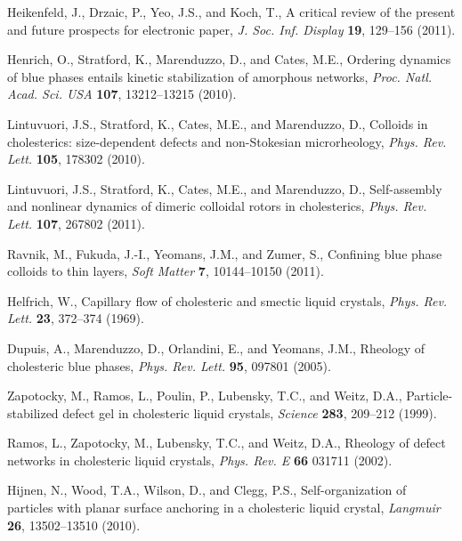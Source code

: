 \documentclass[12pt]{article}
\begin{document}
\begin{thebibliography}{99}
Heikenfeld, J., Drzaic, P., Yeo, J.S., and Koch, T.,
A critical review of the present and future prospects for electronic paper,
{\it J. Soc. Inf. Display} {\bf 19}, 129--156 (2011).

Henrich, O., Stratford, K., Marenduzzo, D., and  Cates, M.E.,
Ordering dynamics of blue phases entails kinetic stabilization of amorphous
networks, {\it Proc. Natl. Acad. Sci. USA} {\bf 107}, 13212--13215 (2010).

Lintuvuori, J.S.,  Stratford, K., Cates, M.E., and Marenduzzo, D.,
Colloids in cholesterics: size-dependent defects and non-Stokesian
microrheology, {\it Phys. Rev. Lett.} {\bf 105}, 178302 (2010).

Lintuvuori, J.S.,  Stratford, K.,  Cates, M.E., and  Marenduzzo, D.,
Self-assembly and nonlinear dynamics of dimeric colloidal rotors in 
cholesterics, {\it Phys. Rev. Lett.} {\bf 107}, 267802 (2011).

Ravnik, M., Fukuda, J.-I.,  Yeomans, J.M., and Zumer, S.,
Confining blue phase colloids to thin layers,
{\it Soft Matter} {\bf 7}, 10144--10150 (2011).

 	Helfrich, W.,
Capillary flow of cholesteric and smectic liquid crystals,
{\it Phys. Rev. Lett.} {\bf 23}, 372--374 (1969).

Dupuis, A.,  Marenduzzo, D.,  Orlandini, E., and Yeomans, J.M.,
Rheology of cholesteric blue phases,
{\it Phys. Rev. Lett.} {\bf 95}, 097801 (2005).

Zapotocky, M., Ramos, L., Poulin, P.,  Lubensky, T.C.,  and Weitz, D.A.,
Particle-stabilized defect gel in cholesteric liquid crystals,
{\it Science} {\bf 283}, 209--212 (1999).

Ramos, L., Zapotocky, M.,  Lubensky, T.C., and  Weitz, D.A.,
Rheology of defect networks in cholesteric liquid crystals,
{\it Phys. Rev. E} {\bf 66} 031711 (2002).

 Hijnen, N., Wood, T.A., Wilson, D., and Clegg, P.S., 
Self-organization of particles with planar surface anchoring in a cholesteric
liquid crystal, {\it Langmuir} {\bf 26}, 13502--13510 (2010).


\end{thebibliography}
\end{document}
